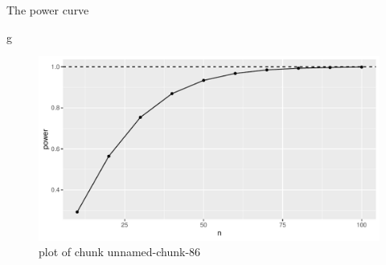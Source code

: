 \documentclass[
  ignorenonframetext,
]{beamer}
\newenvironment{Shaded}{\begin{snugshade}}{\end{snugshade}}
\newcommand{\NormalTok}[1]{#1}
\begin{document}
\begin{frame}[fragile]{The power curve}
\protect\hypertarget{the-power-curve}{}

\begin{Shaded}
\begin{Highlighting}[]
\NormalTok{g}
\end{Highlighting}
\end{Shaded}

\begin{figure}
\centering
\includegraphics{figure/unnamed-chunk-86-1.pdf}
\caption{plot of chunk unnamed-chunk-86}
\end{figure}

\end{frame}
\end{document}
